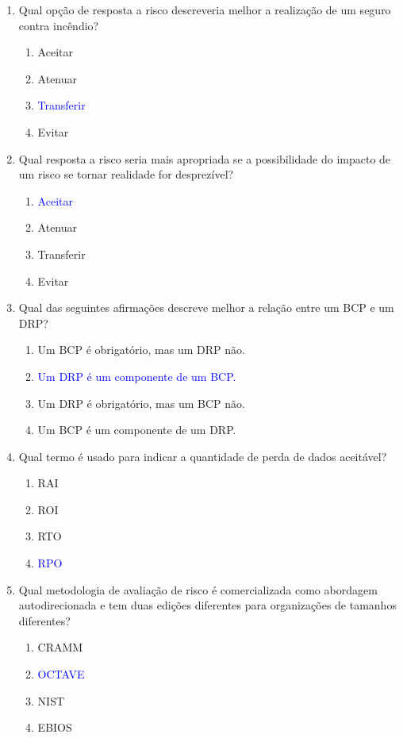 \documentclass{report}
\begin{document}
\begin{enumerate}
		\item Qual opção de resposta a risco descreveria melhor a realização de um seguro contra incêndio?
		\begin{enumerate}[label=(\alph*)]
			\item Aceitar
			\item Atenuar
			\item \textcolor{blue}{Transferir}
			\item Evitar
		\end{enumerate}
		
		\item Qual resposta a risco seria mais apropriada se a possibilidade do impacto de um risco se tornar realidade for desprezível?
		\begin{enumerate}[label=(\alph*)]
			\item \textcolor{blue}{Aceitar}
			\item Atenuar
			\item Transferir
			\item Evitar
		\end{enumerate}
		
		\item Qual das seguintes afirmações descreve melhor a relação entre um BCP e um DRP?
		\begin{enumerate}[label=(\alph*)]
			\item Um BCP é obrigatório, mas um DRP não.
			\item \textcolor{blue}{Um DRP é um componente de um BCP.}
			\item Um DRP é obrigatório, mas um BCP não.
			\item Um BCP é um componente de um DRP.
		\end{enumerate}
		
		\item Qual termo é usado para indicar a quantidade de perda de dados aceitável?
		\begin{enumerate}[label=(\alph*)]
			\item RAI
			\item ROI
			\item RTO
			\item \textcolor{blue}{RPO}
		\end{enumerate}
		
		\item Qual metodologia de avaliação de risco é comercializada como abordagem autodirecionada e tem duas edições diferentes para organizações de tamanhos diferentes?
		\begin{enumerate}[label=(\alph*)]
			\item CRAMM
			\item \textcolor{blue}{OCTAVE}
			\item NIST
			\item EBIOS
		\end{enumerate}
		

\end{enumerate}
\end{document}
